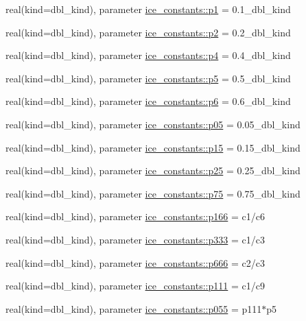 \begin{DoxyCompactItemize}
real(kind=dbl\_\-kind), parameter \hyperlink{namespaceice__constants_a2defc12f4f68fac27d1f0b4848b9d77e}{ice\_\-constants::p1} = 0.1\_\-dbl\_\-kind
\item 
real(kind=dbl\_\-kind), parameter \hyperlink{namespaceice__constants_a14e6139c0f7bfd47c5fed3e88620be22}{ice\_\-constants::p2} = 0.2\_\-dbl\_\-kind
\item 
real(kind=dbl\_\-kind), parameter \hyperlink{namespaceice__constants_aa6ad846377c0f3b955303559a2262b78}{ice\_\-constants::p4} = 0.4\_\-dbl\_\-kind
\item 
real(kind=dbl\_\-kind), parameter \hyperlink{namespaceice__constants_a26872e9df91fb7484a1a2ddefd7b71b0}{ice\_\-constants::p5} = 0.5\_\-dbl\_\-kind
\item 
real(kind=dbl\_\-kind), parameter \hyperlink{namespaceice__constants_a86103f3a8306abd46a8a68ede82f2ee4}{ice\_\-constants::p6} = 0.6\_\-dbl\_\-kind
\item 
real(kind=dbl\_\-kind), parameter \hyperlink{namespaceice__constants_aec49f3df6ec3235c6304038e8fddbe00}{ice\_\-constants::p05} = 0.05\_\-dbl\_\-kind
\item 
real(kind=dbl\_\-kind), parameter \hyperlink{namespaceice__constants_a8312dd00bbc8aad76e555bff87f11f47}{ice\_\-constants::p15} = 0.15\_\-dbl\_\-kind
\item 
real(kind=dbl\_\-kind), parameter \hyperlink{namespaceice__constants_acf8570fae8090e3892e40648fe1a0036}{ice\_\-constants::p25} = 0.25\_\-dbl\_\-kind
\item 
real(kind=dbl\_\-kind), parameter \hyperlink{namespaceice__constants_a266f93c94a2bacfaea88290d50220b36}{ice\_\-constants::p75} = 0.75\_\-dbl\_\-kind
\item 
real(kind=dbl\_\-kind), parameter \hyperlink{namespaceice__constants_ab9c8c51bf25c869a87c12048d123a2c6}{ice\_\-constants::p166} = c1/c6
\item 
real(kind=dbl\_\-kind), parameter \hyperlink{namespaceice__constants_a9dfb9e1671683be9cb08717f174638cc}{ice\_\-constants::p333} = c1/c3
\item 
real(kind=dbl\_\-kind), parameter \hyperlink{namespaceice__constants_a623680825d166c04e044e75e3eb2d6be}{ice\_\-constants::p666} = c2/c3
\item 
real(kind=dbl\_\-kind), parameter \hyperlink{namespaceice__constants_a8bd880bb5783b5dc60e535b9fc37c3e7}{ice\_\-constants::p111} = c1/c9
\item 
real(kind=dbl\_\-kind), parameter \hyperlink{namespaceice__constants_aa715e54741a308eed3ebb5bfe30d82c2}{ice\_\-constants::p055} = p111$\ast$p5

\end{DoxyCompactItemize}
